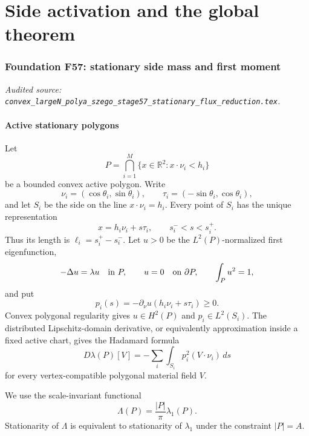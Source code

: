 \documentclass[11pt]{amsart}
\numberwithin{equation}{section}
\theoremstyle{definition}
\theoremstyle{remark}
\begin{document}
\part{Side activation and the global theorem}

\begingroup
\section{Foundation F57: stationary side mass and first moment}
\label{module:F57}
\noindent\textit{Audited source: \nolinkurl{convex_largeN_polya_szego_stage57_stationary_flux_reduction.tex}.}
\subsection{Active stationary polygons}

Let
\begin{equation}
 P=\bigcap_{i=1}^M\{x\in\mathbb R^2:x\cdot\nu_i<h_i\}
\end{equation}
be a bounded convex active polygon.  Write
\begin{equation}
 \nu_i=(\cos\theta_i,\sin\theta_i),\qquad
 \tau_i=(-\sin\theta_i,\cos\theta_i),
\end{equation}
and let $S_i$ be the side on the line $x\cdot\nu_i=h_i$.
Every point of $S_i$ has the unique representation
\begin{equation}\label{F57:eq:side-coordinate}
 x=h_i\nu_i+s\tau_i,\qquad s_i^-<s<s_i^+.
\end{equation}
Thus its length is
$\ell_i=s_i^+-s_i^-$.  Let $u>0$ be the $L^2(P)$-normalized first
eigenfunction,
\begin{equation}\label{F57:eq:eigen}
 -\Delta u=\lambda u\quad\hbox{in }P,\qquad
 u=0\quad\hbox{on }\partial P,\qquad
 \int_Pu^2=1,
\end{equation}
and put
\begin{equation}
 p_i(s)=-\partial_\nu u(h_i\nu_i+s\tau_i)\ge0.
\end{equation}
Convex polygonal regularity gives $u\in H^2(P)$ and
$p_i\in L^2(S_i)$.  The distributed Lipschitz-domain derivative, or
equivalently approximation inside a fixed active chart, gives the Hadamard
formula
\begin{equation}\label{F57:eq:Hadamard}
 D\lambda(P)[V]=-
 \sum_i\int_{S_i}p_i^2(V\cdot\nu_i)\,ds
\end{equation}
for every vertex-compatible polygonal material field $V$.

We use the scale-invariant functional
\begin{equation}
 \Lambda(P)=\frac{|P|}{\pi}\lambda_1(P).
\end{equation}
Stationarity of $\Lambda$ is equivalent to stationarity of $\lambda_1$
under the constraint $|P|=A$.
\end{document}
